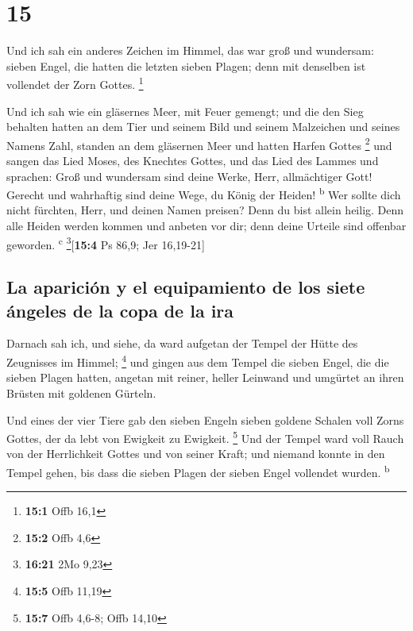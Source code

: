 \hypertarget{section-14}{%
\section{15}\label{section-14}}

 Und ich sah ein anderes Zeichen im Himmel, das war groß
und wundersam: sieben Engel, die hatten die letzten sieben Plagen; denn
mit denselben ist vollendet der Zorn Gottes. \footnote{\textbf{15:1}
  Offb 16,1}

 Und ich sah wie ein gläsernes Meer, mit Feuer gemengt;
und die den Sieg behalten hatten an dem Tier und seinem Bild und seinem
Malzeichen und seines Namens Zahl, standen an dem gläsernen Meer und
hatten Harfen Gottes \footnote{\textbf{15:2} Offb 4,6} 
und sangen das Lied Moses, des Knechtes Gottes, und das Lied des Lammes
und sprachen: Groß und wundersam sind deine Werke, Herr, allmächtiger
Gott! Gerecht und wahrhaftig sind deine Wege, du König der Heiden!
\textsuperscript{b}  Wer sollte dich nicht fürchten, Herr,
und deinen Namen preisen? Denn du bist allein heilig. Denn alle Heiden
werden kommen und anbeten vor dir; denn deine Urteile sind offenbar
geworden. \textsuperscript{c} \footnote{\textbf{16:21} 2Mo 9,23}{[}\textbf{15:4}
Ps 86,9; Jer 16,19-21{]}

\hypertarget{la-apariciuxf3n-y-el-equipamiento-de-los-siete-uxe1ngeles-de-la-copa-de-la-ira}{%
\subsection{La aparición y el equipamiento de los siete ángeles de la
copa de la
ira}\label{la-apariciuxf3n-y-el-equipamiento-de-los-siete-uxe1ngeles-de-la-copa-de-la-ira}}

 Darnach sah ich, und siehe, da ward aufgetan der Tempel
der Hütte des Zeugnisses im Himmel; \footnote{\textbf{15:5} Offb 11,19}
 und gingen aus dem Tempel die sieben Engel, die die
sieben Plagen hatten, angetan mit reiner, heller Leinwand und umgürtet
an ihren Brüsten mit goldenen Gürteln.

 Und eines der vier Tiere gab den sieben Engeln sieben
goldene Schalen voll Zorns Gottes, der da lebt von Ewigkeit zu Ewigkeit.
\footnote{\textbf{15:7} Offb 4,6-8; Offb 14,10}  Und der
Tempel ward voll Rauch von der Herrlichkeit Gottes und von seiner Kraft;
und niemand konnte in den Tempel gehen, bis dass die sieben Plagen der
sieben Engel vollendet wurden. \textsuperscript{b}

